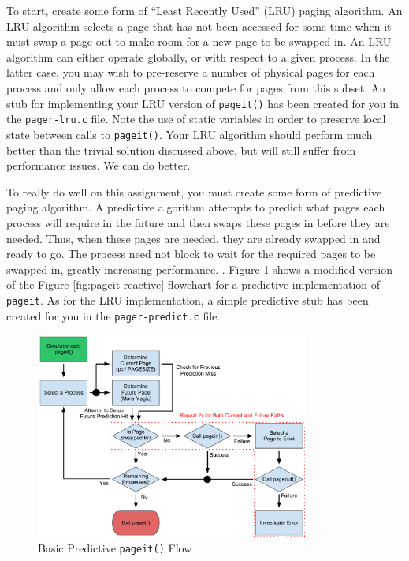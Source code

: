 \documentclass[12pt]{article}
\begin{document}
To start, create some form of ``Least Recently Used'' (LRU) paging
algorithm. An LRU algorithm selects a page that has not been accessed
for some time when it must swap a page out to make room for a new
page to be swapped in. An LRU algorithm can either operate globally, or
with respect to a given process. In the latter case, you may wish to
pre-reserve a number of physical pages for each process and only allow
each process to compete for pages from this subset. An stub for
implementing your LRU version of \texttt{pageit()} has been created for
you in the \texttt{pager-lru.c} file. Note the use of static variables
in order to preserve local state between calls to \texttt{pageit()}.
Your LRU algorithm
should perform much better than the trivial solution discussed above,
but will still suffer from performance issues. We can do better.

To really do well on this assignment, you must create some form of
predictive paging algorithm. A predictive algorithm attempts to predict
what pages each process will require in the future and then swaps
these pages in before they are needed. Thus, when these pages are needed,
they are already swapped in and ready to go. The process need not
block to wait for the required pages to be swapped in, greatly
increasing performance. . Figure
\ref{fig:pageit-predictive} shows a modified version of the Figure
\ref{fig:pageit-reactive} flowchart for a predictive implementation of
\texttt{pageit}. As for the LRU implementation, a simple predictive stub
has been created for you in the \texttt{pager-predict.c} file.

\begin{figure}[htbp]
  \begin{center}
    \includegraphics[width=0.8\textwidth]{pageit-Fig2.pdf}
    \caption{Basic Predictive \texttt{pageit()} Flow}
    \label{fig:pageit-predictive}
  \end{center}
\end{figure}
\end{document}
